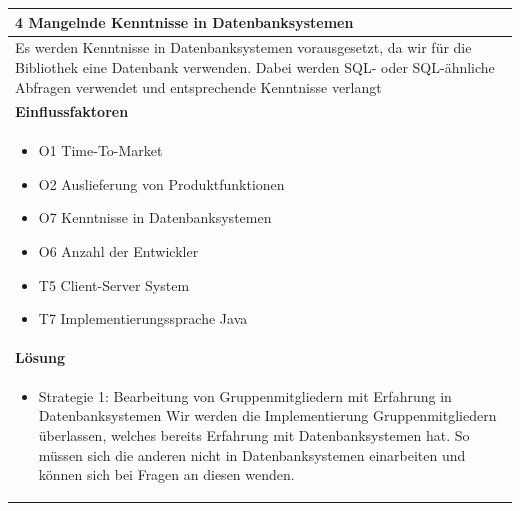 \documentclass[fontsize=12pt,paper=a4,twoside]{scrartcl}
\begin{document}
\begin{table}[H]
\begin{tabular}{|p{\textwidth}|}\hline
4 Mangelnde Kenntnisse in Datenbanksystemen\\ \hline
Es werden Kenntnisse in Datenbanksystemen vorausgesetzt, da wir für die Bibliothek eine Datenbank verwenden. Dabei werden SQL- oder SQL-ähnliche Abfragen verwendet und entsprechende Kenntnisse verlangt \\ \hline
\textbf{Einflussfaktoren}\\
\begin{itemize}
\item O1 Time-To-Market
\item O2 Auslieferung von Produktfunktionen
\item O7 Kenntnisse in Datenbanksystemen
\item O6 Anzahl der Entwickler
\item T5 Client-Server System
\item T7 Implementierungssprache Java
\end{itemize}\\ \hline
\textbf{Lösung}\\
\begin{itemize}
\item Strategie 1: Bearbeitung von Gruppenmitgliedern mit Erfahrung in Datenbanksystemen \leavevmode\newline
Wir werden die Implementierung Gruppenmitgliedern überlassen, welches bereits Erfahrung mit Datenbanksystemen hat. So müssen sich die anderen nicht in Datenbanksystemen einarbeiten und können sich bei Fragen an diesen wenden.
\end{itemize}\\ \hline
\end{tabular}
\end{table}
\end{document}
